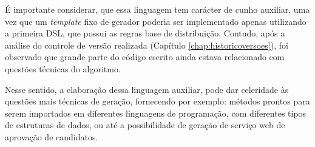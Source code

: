    
 
 É importante considerar, que essa linguagem tem carácter de cunho auxiliar, uma vez que um \textit{template} fixo de gerador poderia ser implementado apenas utilizando a primeira \gls{DSL}, que possui as regras base de distribuição. Contudo, após a análise do controle de versão realizada (Capítulo \ref{chap:historicoversoes}), foi observado que grande parte do código escrito ainda estava relacionado com questões técnicas do algoritmo.
 
 Nesse sentido, a elaboração dessa linguagem auxiliar, pode dar celeridade às questões mais técnicas de geração, fornecendo por exemplo: métodos prontos para serem importados em diferentes linguagens de programação, com diferentes tipos de estruturas de dados, ou até a possibilidade de geração de serviço web de aprovação de candidatos.
